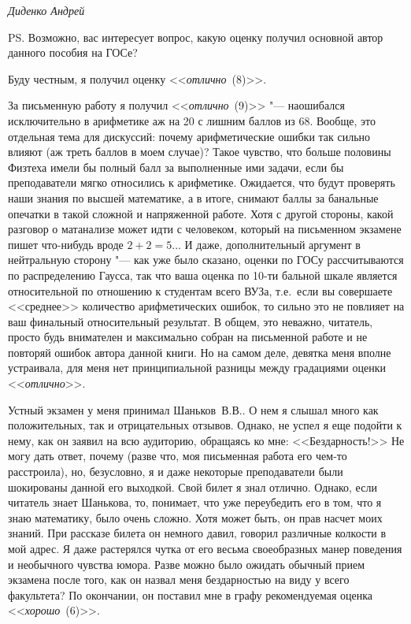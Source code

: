 \mbox{}

\noindent\textit{Диденко Андрей}

\mbox{}

PS. Возможно, вас интересует вопрос, какую оценку получил основной автор данного пособия на ГОСе? 

Буду честным, я получил оценку <<\textit{отлично}~(8)>>. 

За письменную работу я получил <<\textit{отлично}~(9)>> "--- наошибался исключительно в арифметике аж на 20 с лишним баллов из 68. Вообще, это отдельная тема для дискуссий: почему арифметические ошибки так сильно влияют (аж треть баллов в моем случае)? Такое чувство, что больше половины Физтеха имели бы полный балл за выполненные ими задачи, если бы преподаватели мягко относились к арифметике. Ожидается, что будут проверять наши знания по высшей математике, а в итоге, снимают баллы за банальные опечатки в такой сложной и напряженной работе. Хотя с другой стороны, какой разговор о матанализе может идти с человеком, который на письменном экзамене пишет что-нибудь вроде $2 + 2 = 5$... И даже, дополнительный аргумент в нейтральную сторону "--- как уже было сказано, оценки по ГОСу рассчитываются по распределению Гаусса, так что ваша оценка по 10-ти бальной шкале является относительной по отношению к студентам всего ВУЗа, т.е.~если вы совершаете <<среднее>> количество арифметических ошибок, то сильно это не повлияет на ваш финальный относительный результат. В общем, это неважно, читатель, просто будь внимателен и максимально собран на письменной работе и не повторяй ошибок автора данной книги. Но на самом деле, девятка меня вполне устраивала, для меня нет принципиальной разницы между градациями оценки <<\textit{отлично}>>.

Устный экзамен у меня принимал Шаньков~В.В.. О нем я слышал много как положительных, так и отрицательных отзывов. Однако, не успел я еще подойти к нему, как он заявил на всю аудиторию, обращаясь ко мне: <<Бездарность!>> Не могу дать ответ, почему (разве что, моя письменная работа его чем-то расстроила), но, безусловно, я и даже некоторые преподаватели были шокированы данной его выходкой. Свой билет я знал отлично. Однако, если читатель знает Шанькова, то, понимает, что уже переубедить его в том, что я знаю математику, было очень сложно. Хотя может быть, он прав насчет моих знаний. При рассказе билета он немного давил, говорил различные колкости в мой адрес. Я даже растерялся чутка от его весьма своеобразных манер поведения и необычного чувства юмора. Разве можно было ожидать обычный прием экзамена после того, как он назвал меня бездарностью на виду у всего факультета? По окончании, он поставил мне в графу рекомендуемая оценка <<\textit{хорошо}~(6)>>. 

